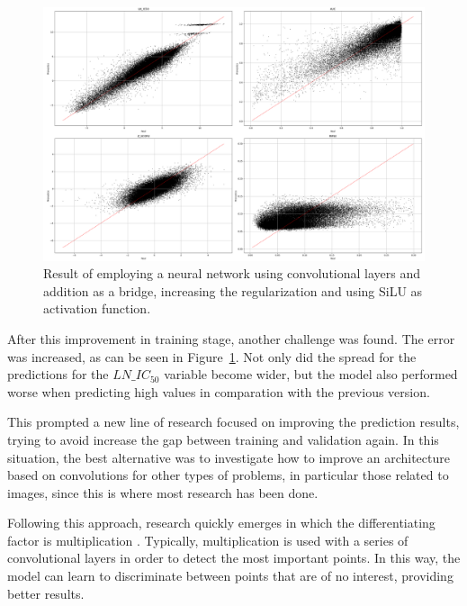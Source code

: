 \begin{figure}[H]
    \centering
    \includegraphics[width=1\textwidth]{figures/neural_net_regression_addition/output_neural_net_addition_balanced.png}
    \caption{Result of employing a neural network using convolutional layers and addition as a bridge, increasing the regularization and using SiLU as activation function.}
    \label{fig:result_addtion_reg_balanced}
\end{figure}

After this improvement in training stage, another challenge was found. The error was increased, as can be seen in Figure~\ref{fig:result_addtion_reg_balanced}. Not only did the spread for the predictions for the \(LN\_IC_{50}\) variable become wider, but the model also performed worse when predicting high values in comparation with the previous version.

This prompted a new line of research focused on improving the prediction results, trying to avoid increase the gap between training and validation again. In this situation, the best alternative was to investigate how to improve an architecture based on convolutions for other types of problems, in particular those related to images, since this is where most research has been done. 

Following this approach, research quickly emerges in which the differentiating factor is multiplication \cite{contextgatedconvolution} \cite{gatedscnngatedshapecnns}. Typically, multiplication is used with a series of convolutional layers in order to detect the most important points. In this way, the model can learn to discriminate between points that are of no interest, providing better results.

